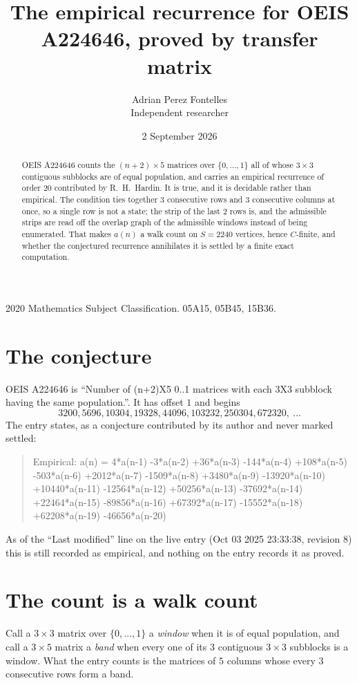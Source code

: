 \documentclass[11pt,a4paper]{article}
\title{The empirical recurrence for OEIS A224646, proved by transfer matrix}
\author{Adrian Perez Fontelles\\ \small Independent researcher}
\date{2 September 2026}
\theoremstyle{plain}
\theoremstyle{definition}
\begin{document}
\maketitle

\begin{abstract}
OEIS A224646 counts the $(n+2)\times5$ matrices over $\{0,\dots,1\}$ all of whose
$3\times3$ contiguous subblocks are of equal population, and carries an empirical recurrence of order
$20$ contributed by R.~H.~Hardin. It is true, and it is decidable rather than empirical.
The condition ties together $3$ consecutive rows and $3$ consecutive columns at once, so a
single row is not a state; the strip of the last $2$ rows is, and the admissible strips
are read off the overlap graph of the admissible windows instead of being enumerated. That
makes $a(n)$ a walk count on $S=2240$ vertices, hence $C$-finite, and whether the conjectured
recurrence annihilates it is settled by a finite exact computation.
\end{abstract}

\noindent\small 2020 Mathematics Subject Classification. 05A15, 05B45, 15B36.\normalsize

\section{The conjecture}

OEIS A224646 is ``Number of (n+2)X5 0..1 matrices with each 3X3 subblock having the same population.''. It has offset $1$ and begins
\[
3200, 5696, 10304, 19328, 44096, 103232, 250304, 672320,\ \dots
\]
The entry states, as a conjecture contributed by its author and never marked settled:
\begin{quote}
Empirical: a(n) = 4*a(n-1) -3*a(n-2) +36*a(n-3) -144*a(n-4) +108*a(n-5) -503*a(n-6) +2012*a(n-7) -1509*a(n-8) +3480*a(n-9) -13920*a(n-10) +10440*a(n-11) -12564*a(n-12) +50256*a(n-13) -37692*a(n-14) +22464*a(n-15) -89856*a(n-16) +67392*a(n-17) -15552*a(n-18) +62208*a(n-19) -46656*a(n-20)
\end{quote}
As of the ``Last modified'' line on the live entry (Oct 03 2025 23:33:38, revision 8) this is still
recorded as empirical, and nothing on the entry records it as proved.

\section{The count is a walk count}

Call a $3\times3$ matrix over $\{0,\dots,1\}$ a \emph{window} when it is of equal population, and
call a $3\times5$ matrix a \emph{band} when every one of its $3$ contiguous
$3\times3$ subblocks is a window. What the entry counts is the matrices of $5$ columns
whose every $3$ consecutive rows form a band.
\end{document}
